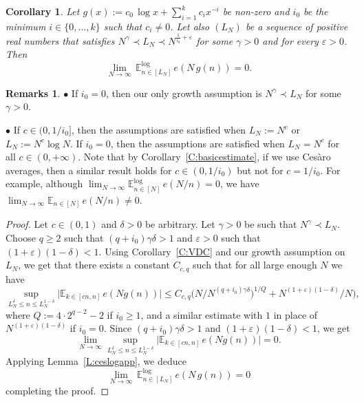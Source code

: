 \documentclass[11pt]{amsart}
\newtheorem{corollary}[lemma]{Corollary}
\theoremstyle{definition}
\newtheorem*{remarks}{Remarks}
\newcommand{\lE}{\mathbb{E}^{\log}}
\newcommand{\E}{{\mathbb E}}
\begin{document}
 	\begin{corollary}\label{C:basicestimatelog}	
 	Let  $g(x):=c_0\, \log x +\sum_{i=1}^kc_i x^{-i}$ be non-zero
 	and $
 	i_0$ be the minimum   $i\in \{0,\ldots, k\}$ such that $c_i\neq 0$.
 	Let also   $(L_N)$ be a sequence of positive real numbers that    satisfies
 	$N^{\gamma}\prec L_N\prec  N^{\frac{1}{i_0}+\varepsilon} $
 	 for some $\gamma>0$ and for every $\varepsilon>0$.
 	Then 	
 	$$
 	\lim_{N\to\infty} \, 	\lE_{n\in [L_N]}\,  e(N\, g(n))=0.
 	$$
 \end{corollary}
\begin{remarks}
$\bullet$
	If $i_0=0$, then  our only growth assumption is $N^{\gamma}\prec L_N$ for some $\gamma>0$.


$\bullet$  If $c\in (0,1/i_0]$, then   the assumptions are satisfied when $L_N:=N^c$  or $L_N:=N^c\log N$. If $i_0=0$,  then the assumptions are satisfied when  $L_N=N^c$ for all $c\in (0,+\infty)$.
 Note that by Corollary~\ref{C:basicestimate},  if we use  Ces\`aro averages, then a similar result holds for  $c\in (0,1/i_0)$ but not for  $c=1/i_0$.
 For example, although  $\lim_{N\to\infty} \lE_{n\in[N]}\, e(N/n)=0$, we have $\lim_{N\to\infty} \E_{n\in[N]}\, e(N/n)\neq 0$.
\end{remarks}
 \begin{proof}
 	Let $c\in (0,1)$ and $\delta>0$ be arbitrary. Let $\gamma>0$ be such that  $N^{\gamma}\prec L_N$. Choose $q\geq 2$ such that $(q+i_0)\gamma \delta>1$ and $\varepsilon>0$ such that $(1+\varepsilon) (1-\delta)<1$.  Using Corollary~\ref{C:VDC} and our growth assumption on $L_N$, we get that
 	 there exists a constant $C_{c,q}$  such that for  all large enough $N$ we have
 	$$
 	\sup_{L_N^\delta\leq n\leq L_N^{1-\delta}}\big |\E_{k\in [cn,n]} \, e(Ng(n))\big| \leq
 	C_{c,q}\big(N /N^{ (q+i_0)\gamma\delta})^{1/Q}+N^{(1+\varepsilon)(1-\delta)}/N\big),
 	$$
 	where $Q:=4\cdot 2^{q-2}-2$ if $i_0\geq 1$, and a similar estimate with $1$
 	in place of $N^{(1+\varepsilon)(1-\delta)}$ if $i_0=0$.
 	Since $(q+i_0)\gamma \delta>1$ and $(1+\varepsilon) (1-\delta)<1$,
 	we get
 	$$
\lim_{N\to\infty} 	\sup_{L_N^\delta\leq n\leq L_N^{1-\delta}}\big |\E_{k\in [cn,n]} \, e(Ng(n))\big| =0.
 	$$
 	Applying Lemma~\ref{L:ceslogapp}, we deduce
 	$$
 	\lim_{N\to\infty} \, 	\lE_{n\in [L_N]}\,  e(N\, g(n))=0
 	$$
 	completing the proof.
 \end{proof}
\end{document}
